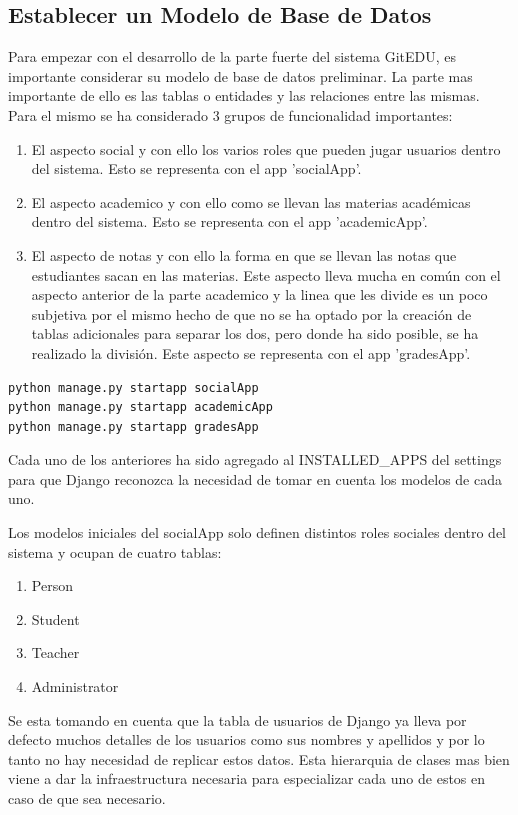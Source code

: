 \subsection{Establecer un Modelo de Base de Datos}
Para empezar con el desarrollo de la parte fuerte del sistema GitEDU, es importante considerar su modelo de base de datos preliminar. La parte mas importante de ello es las tablas o entidades y las relaciones entre las mismas. Para el mismo se ha considerado 3 grupos de funcionalidad importantes:
\begin{enumerate}
	\item El aspecto social y con ello los varios roles que pueden jugar usuarios dentro del sistema. Esto se representa con el app 'socialApp'.
    \item El aspecto academico y con ello como se llevan las materias académicas dentro del sistema. Esto se representa con el app 'academicApp'.
    \item El aspecto de notas y con ello la forma en que se llevan las notas que estudiantes sacan en las materias. Este aspecto lleva mucha en común con el aspecto anterior de la parte academico y la linea que les divide es un poco subjetiva por el mismo hecho de que no se ha optado por la creación de tablas adicionales para separar los dos, pero donde ha sido posible, se ha realizado la división. Este aspecto se representa con el app 'gradesApp'. 
\end{enumerate}

\begin{lstlisting}
python manage.py startapp socialApp
python manage.py startapp academicApp
python manage.py startapp gradesApp
\end{lstlisting}

Cada uno de los anteriores ha sido agregado al INSTALLED\_APPS del settings para que Django reconozca la necesidad de tomar en cuenta los modelos de cada uno.

Los modelos iniciales del socialApp solo definen distintos roles sociales dentro del sistema y ocupan de cuatro tablas:
\begin{enumerate}
	\item Person
	\item Student
	\item Teacher
	\item Administrator
\end{enumerate}
Se esta tomando en cuenta que la tabla de usuarios de Django ya lleva por defecto muchos detalles de los usuarios como sus nombres y apellidos y por lo tanto no hay necesidad de replicar estos datos. Esta hierarquia de clases mas bien viene a dar la infraestructura necesaria para especializar cada uno de estos en caso de que sea necesario.

